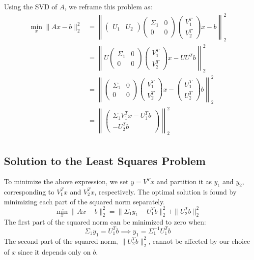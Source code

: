 Using the SVD of $A$, we reframe this problem as:
\[
\begin{aligned}
    \min_x \| Ax - b \|_2^2 &=
    \left\|
        \begin{pmatrix} U_1 & U_2 \end{pmatrix}
        \begin{pmatrix} \Sigma_1 & 0 \\ 0 & 0 \end{pmatrix}
        \begin{pmatrix} V_1^T \\ V_2^T \end{pmatrix}
        x - b
    \right\|_2^2 \\
    & = \left\|
        U \begin{pmatrix}
        \Sigma_1 & 0 \\
        0 & 0 
        \end{pmatrix}
        \begin{pmatrix}
            V_1^T \\
            V_2^T
        \end{pmatrix}
        x - UU^T b
    \right\|_2^2 \\
    & = \left\|
    \begin{pmatrix}
        \Sigma_1 & 0 \\
        0 & 0 
        \end{pmatrix}
        \begin{pmatrix}
            V_1^T \\
            V_2^T
        \end{pmatrix}
        x - 
        \begin{pmatrix}
            U_1^T \\
            U_2^T
        \end{pmatrix}b
    \right\|_2^2 \\
    & = \left\|
        \begin{pmatrix}
            \Sigma_1 V_1^T x - U_1^T b\\
            - U_2^T b
        \end{pmatrix}
    \right\|_2^2 \\
\end{aligned}
\]

\subsection*{Solution to the Least Squares Problem}
To minimize the above expression, we set $y = V^T x$ and partition it as $y_1$ and $y_2$, corresponding to $V_1^T x$ and $V_2^T x$, respectively. The optimal solution is found by minimizing each part of the squared norm separately.
\[
\min_x \| Ax - b \|_2^2 = \| \Sigma_1 y_1 - U_1^T b \|_2^2 + \| U_2^T b \|_2^2
\]
The first part of the squared norm can be minimized to zero when:
\[
\Sigma_1 y_1 = U_1^T b \implies y_1 = \Sigma_1^{-1} U_1^T b
\]
The second part of the squared norm, $\| U_2^T b \|_2^2$, cannot be affected by our choice of $x$ since it depends only on $b$. 

